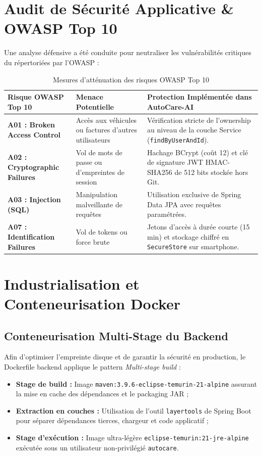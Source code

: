 \documentclass[12pt,a4paper,oneside]{report}
\newcommand{\bpuce}{\textcolor{midBlue}{$\blacktriangleright$}\;}
\begin{document}
\section{Audit de S\'ecurit\'e Applicative \& OWASP Top 10}
Une analyse d\'efensive a \'et\'e conduite pour neutraliser les vuln\'erabilit\'es critiques du r\'epertori\'ees par l'OWASP :

\begin{table}[H]
\centering
\small
\begin{tabularx}{\textwidth}{p{3.8cm} p{4.2cm} X}
\toprule
\textbf{Risque OWASP Top 10} & \textbf{Menace Potentielle} & \textbf{Protection Impl\'ement\'ee dans AutoCare-AI} \\
\midrule
\textbf{A01 : Broken Access Control} & Acc\`es aux v\'ehicules ou factures d'autres utilisateurs & V\'erification stricte de l'ownership au niveau de la couche Service (\texttt{findByUserAndId}). \\
\addlinespace
\textbf{A02 : Cryptographic Failures} & Vol de mots de passe ou d'empreintes de session & Hachage BCrypt (co\^ut 12) et cl\'e de signature JWT HMAC-SHA256 de 512 bits stock\'ee hors Git. \\
\addlinespace
\textbf{A03 : Injection (SQL)} & Manipulation malveillante de requ\^etes & Utilisation exclusive de Spring Data JPA avec requ\^etes param\'etr\'ees. \\
\addlinespace
\textbf{A07 : Identification Failures} & Vol de tokens ou force brute & Jetons d'acc\`es \`a dur\'ee courte (15 min) et stockage chiffr\'e en \texttt{SecureStore} sur smartphone. \\
\bottomrule
\end{tabularx}
\caption{Mesures d'att\'enuation des risques OWASP Top 10}
\label{tab:owasp}
\end{table}

\section{Industrialisation et Conteneurisation Docker}

\subsection{Conteneurisation Multi-Stage du Backend}
Afin d'optimiser l'empreinte disque et de garantir la s\'ecurit\'e en production, le Dockerfile backend applique le pattern \textit{Multi-stage build} :
\begin{itemize}[label=\bpuce]
  \item \textbf{Stage de build :} Image \texttt{maven:3.9.6-eclipse-temurin-21-alpine} assurant la mise en cache des d\'ependances et le packaging JAR ;
  \item \textbf{Extraction en couches :} Utilisation de l'outil \texttt{layertools} de Spring Boot pour s\'eparer d\'ependances tierces, chargeur et code applicatif ;
  \item \textbf{Stage d'ex\'ecution :} Image ultra-l\'eg\`ere \texttt{eclipse-temurin:21-jre-alpine} ex\'ecut\'ee sous un utilisateur non-privil\'egi\'e \texttt{autocare}.
\end{itemize}
\end{document}
